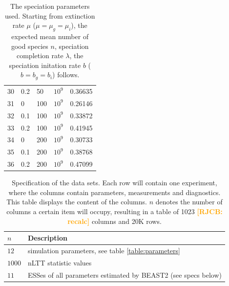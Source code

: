 \documentclass{article}
\newcommand*\richel[1]{\textcolor{orange}{\textbf{[RJCB: #1]}}}
\begin{document}
\begin{table}
\begin{tabular}{|l|l|l|l|l|}
    30 & 0.2 & 50  & $10^9$ & 0.36635 \\
    31 & 0   & 100 & $10^9$ & 0.26146 \\
    32 & 0.1 & 100 & $10^9$ & 0.33872 \\
    33 & 0.2 & 100 & $10^9$ & 0.41945 \\
    34 & 0   & 200 & $10^9$ & 0.30733 \\
    35 & 0.1 & 200 & $10^9$ & 0.38768 \\
    36 & 0.2 & 200 & $10^9$ & 0.47099 \\
    \hline
  \end{tabular}
  \caption{
    The speciation parameters used. Starting from extinction rate $\mu$ ($\mu = \mu_g = \mu_i$), the expected
    mean number of good species $n$, speciation completion rate $\lambda$, the speciation initation
    rate $b$ ($b = b_g = b_i$) follows.  
  }
  \label{table:pbd_parameters}
\end{table}

\begin{table}
  \centering 
  \begin{tabular}{l l}
    \hline
    $n$ & Description \\
    \hline
    \hline
    $12$   & simulation parameters, see table \ref{table:parameters} \\
    $1000$ & nLTT statistic values \\
    $11$ & ESSes of all parameters estimated by BEAST2 (see specs below) \\
    \hline
  \end{tabular}
  \caption{
    Specification of the data sets. Each row will contain one experiment,
    where the columns contain parameters, measurements and diagnostics.
    This table displays the content of the columns. 
    $n$ denotes the number
    of columns a certain item will occupy, resulting in a table of 
    1023 \richel{recalc} columns and 20K rows.
  }
  \label{table:specs}
\end{table}
\end{document}
